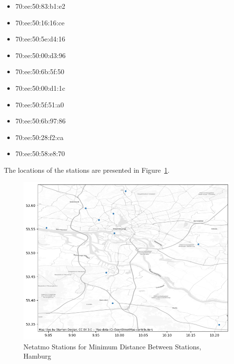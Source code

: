 \begin{itemize}
    \item 70:ee:50:83:b1:e2 
    \item 70:ee:50:16:16:ce
    \item 70:ee:50:5e:d4:16
    \item 70:ee:50:00:d3:96
    \item 70:ee:50:6b:5f:50
    \item 70:ee:50:00:d1:1c
    \item 70:ee:50:5f:51:a0
    \item 70:ee:50:6b:97:86
    \item 70:ee:50:28:f2:ca
    \item 70:ee:50:58:e8:70
\end{itemize}

The locations of the stations are presented in Figure~\ref{fig:eval_hamburg_locations_point_histb_10_map}.

\begin{figure}[ht]
    \centering
    \includegraphics[width=1\textwidth]{images/eval_hamburg_locations_point_histb_10_map.png}
    \caption{Netatmo Stations for Minimum Distance Between Stations, Hamburg}
    \label{fig:eval_hamburg_locations_point_histb_10_map}
\end{figure}